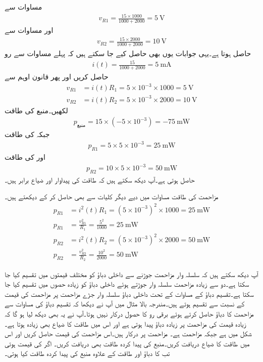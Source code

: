 مساوات  سے
\begin{align*}
v_{R1}=\frac{15 \times 1000}{1000+2000}=\SI{5}{\volt} 
\end{align*}
اور مساوات  سے
\begin{align*}
v_{R2}=\frac{15 \times 2000}{1000+2000}=\SI{10}{\volt} 
\end{align*}
حاصل ہوتا ہے۔یہی جوابات یوں بھی حاصل کیے جا سکتے ہیں کہ پہلے مساوات  سے رو
\begin{align*}
i(t)=\frac{15}{1000+2000}=\SI{5}{\milli\ampere}
\end{align*}
حاصل کریں اور پھر قانون اوہم سے
\begin{align*}
v_{R1}&=i(t) R_1 =5 \times 10^{-3} \times 1000=\SI{5}{\volt}\\
v_{R2}&=i(t) R_2 =5 \times 10^{-3} \times 2000=\SI{10}{\volt}
\end{align*}
لکھیں۔منبع کی طاقت
\begin{align*}
p_{\text{منبع}}=15 \times (-5\times 10^{-3})=\SI{-75}{\milli\watt}
\end{align*}
جبکہ  کی طاقت
\begin{align*}
p_{R1}=5\times 5\times 10^{-3}= \SI{25}{\milli\watt}
\end{align*}
اور  کی طاقت
\begin{align*}
p_{R2}=10\times 5\times 10^{-3}= \SI{50}{\milli\watt}
\end{align*}
حاصل ہوتی ہے۔آپ دیکھ سکتے ہیں کہ طاقت کی پیداوار اور ضیاع برابر ہیں۔

مزاحمت کی طاقت مساوات   میں دیے دیگر کلیات سے بھی حاصل کر کے دیکھتے ہیں۔
\begin{align*}
p_{R1}&=i^2(t) R_1=(5\times 10^{-3})^2 \times 1000=\SI{25}{\milli\watt}\\
p_{R1}&=\frac{v^2_{R1}}{R_1}=\frac{5^2}{1000}=\SI{25}{\milli\watt}\\
p_{R2}&=i^2(t) R_2=(5\times 10^{-3})^2 \times 2000=\SI{50}{\milli\watt}\\
p_{R2}&=\frac{v^2_{R2}}{R_2}=\frac{10^2}{2000}=\SI{50}{\milli\watt}
\end{align*}

آپ دیکھ سکتے ہیں کہ سلسلہ وار مزاحمت جوڑنے سے داخلی دباؤ کو مختلف قیمتوں میں تقسیم کیا جا سکتا ہے۔دو سے زیادہ مزاحمت سلسلہ وار جوڑتے ہوئے داخلی دباؤ کو زیادہ حصوں میں تقسیم کیا جا سکتا ہے۔تقسیم دباؤ کے مساوات کے تحت داخلی دباؤ سلسلہ وار جڑے مزاحمت پر مزاحمت کی قیمت کے نسبت سے تقسیم ہوتے ہیں۔مندرجہ بالا مثال میں آپ نے دیکھا کہ تقسیم دباؤ کی مساوات سے مزاحمت کا دباؤ حاصل کرتے ہوئے  برقی رو  کا حصول درکار نہیں ہوتا۔آپ نے یہ بھی دیکھ لیا ہو گا کہ زیادہ قیمت کی مزاحمت پر زیادہ دباؤ پیدا ہوتی ہے اور اس میں طاقت کا ضیاع بھی زیادہ ہوتا ہے۔
شکل  میں  ہے جبکہ مزاحمت  ہے۔ مزاحمت  پر  درکار ہیں۔اس مزاحمت کی قیمت حاصل کریں اور اس میں طاقت کا ضیاع دریافت کریں۔منبع کی پیدا کردہ طاقت بھی دریافت کریں۔ اگر  کی قیمت  ہوتی تب  کا دباؤ اور  طاقت کے علاوہ منبع کی پیدا کردہ طاقت کیا ہوتی۔

